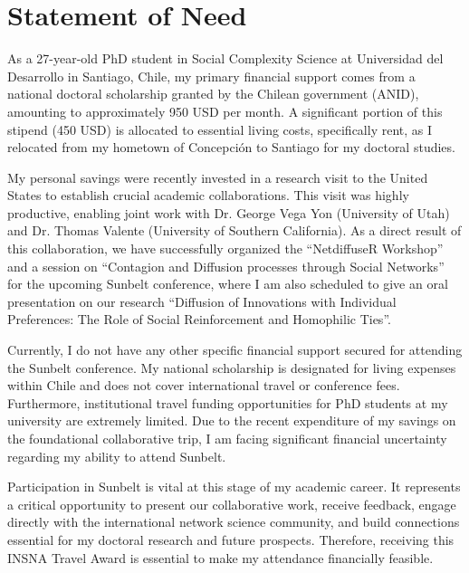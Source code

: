 
\section{Statement of Need}

\vspace{0.5cm}

As a 27-year-old PhD student in Social Complexity Science at Universidad del Desarrollo in Santiago, Chile, my primary financial support comes from a national doctoral scholarship granted by the Chilean government (ANID), amounting to approximately 950 USD per month. A significant portion of this stipend (450 USD) is allocated to essential living costs, specifically rent, as I relocated from my hometown of Concepción to Santiago for my doctoral studies.

My personal savings were recently invested in a research visit to the United States to establish crucial academic collaborations. This visit was highly productive, enabling joint work with Dr. George Vega Yon (University of Utah) and Dr. Thomas Valente (University of Southern California). As a direct result of this collaboration, we have successfully organized the ``NetdiffuseR Workshop'' and a session on ``Contagion and Diffusion processes through Social Networks'' for the upcoming Sunbelt conference, where I am also scheduled to give an oral presentation on our research ``Diffusion of Innovations with Individual Preferences: The Role of Social Reinforcement and Homophilic Ties''.

Currently, I do not have any other specific financial support secured for attending the Sunbelt conference. My national scholarship is designated for living expenses within Chile and does not cover international travel or conference fees. Furthermore, institutional travel funding opportunities for PhD students at my university are extremely limited. Due to the recent expenditure of my savings on the foundational collaborative trip, I am facing significant financial uncertainty regarding my ability to attend Sunbelt.

Participation in Sunbelt is vital at this stage of my academic career. It represents a critical opportunity to present our collaborative work, receive feedback, engage directly with the international network science community, and build connections essential for my doctoral research and future prospects. Therefore, receiving this INSNA Travel Award is essential to make my attendance financially feasible.

